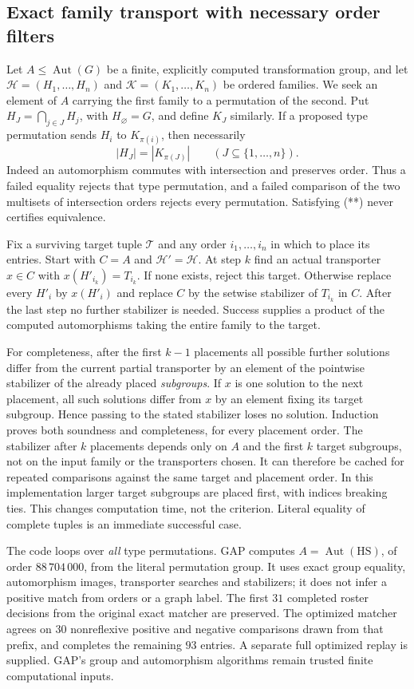 \subsection{Exact family transport with necessary order filters}
Let $A\leq\operatorname{Aut}(G)$ be a finite, explicitly computed
transformation group, and let $\mathcal H=(H_1,\ldots,H_n)$ and
$\mathcal K=(K_1,\ldots,K_n)$ be ordered families. We seek an element of
$A$ carrying the first family to a permutation of the second. Put
$H_J=\bigcap_{j\in J}H_j$, with $H_\varnothing=G$, and define $K_J$
similarly. If a proposed type permutation sends $H_i$ to $K_{\pi(i)}$,
then necessarily
\[
 |H_J|=|K_{\pi(J)}|\qquad(J\subseteq\{1,\ldots,n\}).       \tag{**}
\]
Indeed an automorphism commutes with intersection and preserves order.
Thus a failed equality rejects that type permutation, and a failed
comparison of the two multisets of intersection orders rejects every
permutation. Satisfying (**) never certifies equivalence.

Fix a surviving target tuple $\mathcal T$ and any order
$i_1,\ldots,i_n$ in which to place its entries. Start with $C=A$ and
$\mathcal H' =\mathcal H$. At step $k$ find an actual transporter
$x\in C$ with $x(H'_{i_k})=T_{i_k}$. If none exists, reject this target.
Otherwise replace every $H'_i$ by $x(H'_i)$ and replace $C$ by the
setwise stabilizer of $T_{i_k}$ in $C$. After the last step no further
stabilizer is needed. Success supplies a product of the computed
automorphisms taking the entire family to the target.

For completeness, after the first $k-1$ placements all possible further
solutions differ from the current partial transporter by an element of
the pointwise stabilizer of the already placed \emph{subgroups}. If $x$
is one solution to the next placement, all such solutions differ from
$x$ by an element fixing its target subgroup. Hence passing to the stated
stabilizer loses no solution. Induction proves both soundness and
completeness, for every placement order. The stabilizer after $k$
placements depends only on $A$ and the first $k$ target subgroups, not on
the input family or the transporters chosen. It can therefore be cached
for repeated comparisons against the same target and placement order.
In this implementation larger target subgroups are placed first, with
indices breaking ties. This changes computation time, not the criterion.
Literal equality of complete tuples is an immediate successful case.

The code loops over \emph{all} type permutations. GAP computes
$A=\operatorname{Aut}(\mathrm{HS})$, of order $88\,704\,000$, from the
literal permutation group. It uses exact group equality, automorphism
images, transporter searches and stabilizers; it does not infer a
positive match from orders or a graph label. The first $31$ completed
roster decisions from the original exact matcher are preserved. The
optimized matcher agrees on $30$ nonreflexive positive and negative
comparisons drawn from that prefix, and completes the remaining $93$
entries. A separate full optimized replay is supplied. GAP's group and
automorphism algorithms remain trusted finite computational inputs.
